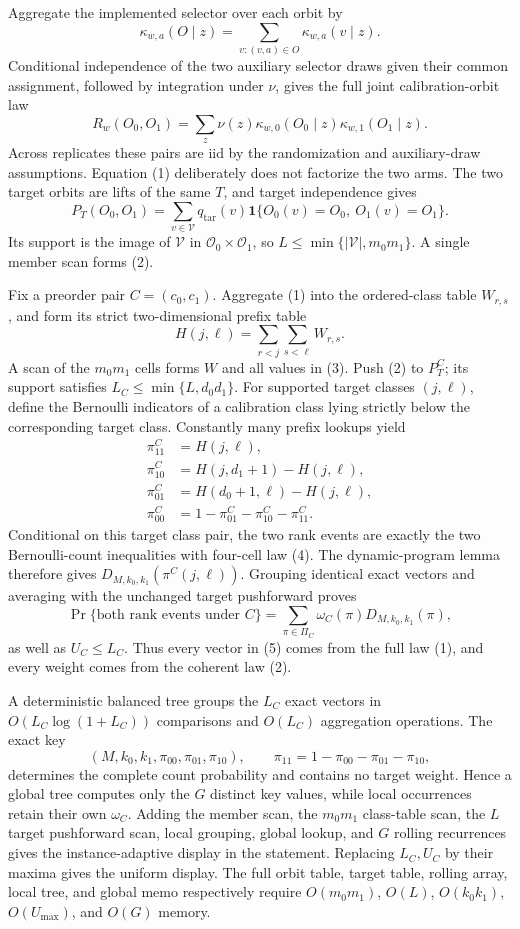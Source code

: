 Aggregate the implemented selector over each orbit by
\[
\kappa_{w,a}(O\mid z)=\sum_{v:(v,a)\in O}\kappa_{w,a}(v\mid z).
\]
Conditional independence of the two auxiliary selector draws given their common assignment, followed by integration under \(\nu\), gives the full joint calibration-orbit law
\[
R_w(O_0,O_1)=\sum_z\nu(z)\kappa_{w,0}(O_0\mid z)\kappa_{w,1}(O_1\mid z).
\tag{1}
\]
Across replicates these pairs are iid by the randomization and auxiliary-draw assumptions. Equation (1) deliberately does not factorize the two arms. The two target orbits are lifts of the same \(T\), and target independence gives
\[
P_T(O_0,O_1)=\sum_{v\in\mathcal V}q_{\mathrm{tar}}(v)\mathbf 1\{O_0(v)=O_0,\ O_1(v)=O_1\}.
\tag{2}
\]
Its support is the image of \(\mathcal V\) in \(\mathcal O_0\times\mathcal O_1\), so \(L\le\min\{|\mathcal V|,m_0m_1\}\). A single member scan forms (2).

Fix a preorder pair \(C=(c_0,c_1)\). Aggregate (1) into the ordered-class table \(W_{r,s}\), and form its strict two-dimensional prefix table
\[
H(j,\ell)=\sum_{r<j}\sum_{s<\ell}W_{r,s}.
\tag{3}
\]
A scan of the \(m_0m_1\) cells forms \(W\) and all values in (3). Push (2) to \(P_T^C\); its support satisfies \(L_C\le\min\{L,d_0d_1\}\). For supported target classes \((j,\ell)\), define the Bernoulli indicators of a calibration class lying strictly below the corresponding target class. Constantly many prefix lookups yield
\[
\begin{aligned}
\pi^C_{11}&=H(j,\ell),\\
\pi^C_{10}&=H(j,d_1+1)-H(j,\ell),\\
\pi^C_{01}&=H(d_0+1,\ell)-H(j,\ell),\\
\pi^C_{00}&=1-\pi^C_{01}-\pi^C_{10}-\pi^C_{11}.
\end{aligned}
\tag{4}
\]
Conditional on this target class pair, the two rank events are exactly the two Bernoulli-count inequalities with four-cell law (4). The dynamic-program lemma therefore gives \(D_{M,k_0,k_1}(\pi^C(j,\ell))\). Grouping identical exact vectors and averaging with the unchanged target pushforward proves
\[
\Pr\{\text{both rank events under }C\}=\sum_{\pi\in\Pi_C}\omega_C(\pi)D_{M,k_0,k_1}(\pi),
\tag{5}
\]
as well as \(U_C\le L_C\). Thus every vector in (5) comes from the full law (1), and every weight comes from the coherent law (2).

A deterministic balanced tree groups the \(L_C\) exact vectors in \(O(L_C\log(1+L_C))\) comparisons and \(O(L_C)\) aggregation operations. The exact key
\[
(M,k_0,k_1,\pi_{00},\pi_{01},\pi_{10}),\qquad \pi_{11}=1-\pi_{00}-\pi_{01}-\pi_{10},
\tag{6}
\]
determines the complete count probability and contains no target weight. Hence a global tree computes only the \(G\) distinct key values, while local occurrences retain their own \(\omega_C\). Adding the member scan, the \(m_0m_1\) class-table scan, the \(L\) target pushforward scan, local grouping, global lookup, and \(G\) rolling recurrences gives the instance-adaptive display in the statement. Replacing \(L_C,U_C\) by their maxima gives the uniform display. The full orbit table, target table, rolling array, local tree, and global memo respectively require \(O(m_0m_1)\), \(O(L)\), \(O(k_0k_1)\), \(O(U_{\max})\), and \(O(G)\) memory.

